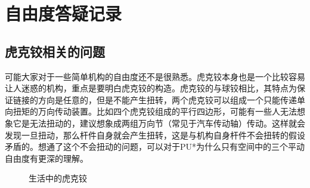 \section{自由度答疑记录}

\subsection{虎克铰相关的问题}

可能大家对于一些简单机构的自由度还不是很熟悉。虎克铰本身也是一个比较容易让人迷惑的机构，重点是要明白虎克铰的构造。虎克铰的与球铰相比，其特点为保证链接的方向是任意的，但是不能产生扭转，两个虎克铰可以组成一个只能传递单向扭矩的万向传动装置。比如四个虎克铰组成的平行四边形，可能有一些人无法想象它是无法扭动的，建议想象成两组万向节（常见于汽车传动轴）传动。这样就会发现一旦扭动，那么杆件自身就会产生扭转，这是与机构自身杆件不会扭转的假设矛盾的。想通了这个不会扭动的问题，可以对于PU*为什么只有空间中的三个平动自由度有更深的理解。

\begin{figure}[htb]
    \centering
    \hfill
    \caption{生活中的虎克铰}
\end{figure}

